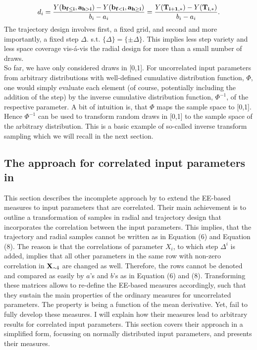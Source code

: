 \documentclass[a4paper,12pt]{article}
\begin{document}
\begin{align}
d_i =  \frac{Y(\bold{b_{f \leq i}}, \bold{a_{h>i}}) - Y(\bold{b_{f<i}}, \bold{a_{h \geq i}})}{b_i - a_i} = \frac{Y(\bold{T_{i+1,*})} -  Y(\bold{T_{i,*}})}{b_i - a_i}.
\end{align}
The trajectory design involves first, a fixed grid, and second and more importantly, a fixed step $\Delta$. s.t. $\{\Delta\} = \{\pm \Delta\}$. This implies less step variety and less space coverage vis-á-vis the radial design for more than a small number of draws.\\

\noindent
So far, we have only considered draws in [0,1]. For uncorrelated input parameters from arbitrary distributions with well-defined cumulative distribution function, $\Phi$, one would simply evaluate each element (of course, potentially including the addition of the step) by the inverse cumulative distribution function, $\Phi^{-1}$, of the respective parameter. A bit of intuition is, that $\Phi$ maps the sample space to [0,1]. Hence $\Phi^{-1}$ can be used to transform random draws in [0,1] to the sample space of the arbitrary distribution. This is a basic example of so-called inverse transform sampling which we will recall in the next section.



\subsection{The approach for correlated input parameters in \cite{ge2017extending}}

This section describes the incomplete approach by \cite{ge2017extending} to extend the EE-based measures to input parameters that are correlated. Their main achievement is to outline a transformation of samples in radial and trajectory design that incorporates the correlation between the input parameters. This implies, that the trajectory and radial samples cannot be written as in Equation (6) and Equation (8). The reason is that the correlations of parameter $X_i$, to which step $\Delta^i$ is added, implies that all other parameters in the same row with non-zero correlation in $\bold{X_{\sim i}}$ are changed as well. Therefore, the rows cannot be denoted and compared as easily by $a$'s and $b$'s as in Equation (6) and (8). Transforming these matrices allows to re-define the EE-based measures accordingly, such that they sustain the main properties of the ordinary measures for uncorrelated parameters. The property is being a function of the mean derivative. Yet, \cite{ge2017extending} fail to fully develop these measures. I will explain how their measures lead to arbitrary results for correlated input parameters. This section covers their approach in a simplified form, focussing on normally distributed input parameters, and presents their measures.\\
\end{document}
